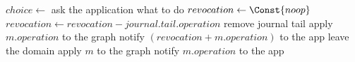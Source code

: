 \documentclass[preview]{standalone}
\begin{document}
  \begin{algorithmic}
        \State $choice\gets$ ask the application what to do
          \State $revocation\gets \Const{noop}$
          \Repeat
            \State $revocation\gets revocation - journal.tail.operation$
            \State remove journal tail
          \State apply $m.operation$ to the graph
          \State notify $(revocation + m.operation)$ to the app
          \State leave the domain
        \EndIf
      \Else
        \State apply $m$ to the graph
        \State notify $m.operation$ to the app
      \EndIf
    \EndProcedure
  \end{algorithmic}
\end{document}
